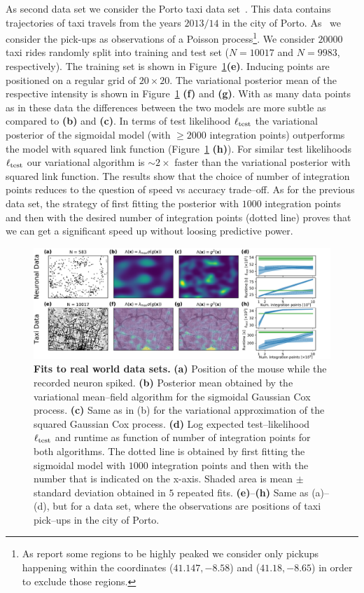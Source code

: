 \documentclass[twoside,11pt]{article}
\begin{document}
As second data set we consider the Porto taxi data set~\citep{moreira2013predicting}. This data contains trajectories of taxi travels from the years $2013/14$ in the city of Porto. As~\citet{john2018large} we consider the pick-ups as observations of a Poisson process\footnote{As \citet{john2018large} report some regions to be highly peaked we consider only pickups happening within the coordinates ($41.147,-8.58$) and ($41.18,-8.65$) in order to exclude those regions.}. We consider $20000$ taxi rides randomly split into training and test set ($N=10017$ and $N=9983$, respectively). The training set is shown in Figure~\ref{fig:fig6}{\bf (e)}. Inducing points are positioned on a regular grid of $20\times 20$. The variational posterior mean of the respective intensity is shown in Figure~\ref{fig:fig6} {\bf (f)} and {\bf (g)}. With as many data points as in these data the differences between the two models are more subtle as compared to {\bf (b)} and {\bf (c)}. In terms of test likelihood $\ell_{\rm test}$ the variational posterior of the sigmoidal model (with $\geq 2000$ integration points) outperforms the model with squared link function (Figure~\ref{fig:fig6} {\bf (h)}). For similar test likelihoods $\ell_{\rm test}$ our variational algorithm is $\sim 2\times$ faster than the variational posterior with squared link function. The results show that the choice of number of integration points reduces to the question of speed vs accuracy trade--off. As for the previous data set, the strategy of first fitting the posterior with $1000$ integration points and then with the desired number of integration points (dotted line) proves that we can get a significant speed up without loosing predictive power.


\begin{figure}
\centering
\includegraphics[width=\textwidth]{figures/lloyd_2d.pdf}
\caption{{\bf Fits to real world data sets.} {\bf (a)} Position of the mouse while the recorded neuron spiked. {\bf (b)} Posterior mean obtained by the variational mean--field algorithm for the sigmoidal Gaussian Cox process. {\bf (c)} Same as in (b) for the variational approximation of the squared Gaussian Cox process. {\bf (d)} Log expected test--likelihood $\ell_{\rm test}$ and runtime as function of number of integration points for both algorithms. The dotted line is obtained by first fitting the sigmoidal model with $1000$ integration points and then with the number that is indicated on the x-axis. Shaded area is mean $\pm$ standard deviation obtained in $5$ repeated fits.  {\bf (e)}--{\bf (h)} Same as (a)--(d), but for a data set, where the observations are positions of taxi pick--ups in the city of Porto.}\label{fig:fig6}
\end{figure}
\end{document}
